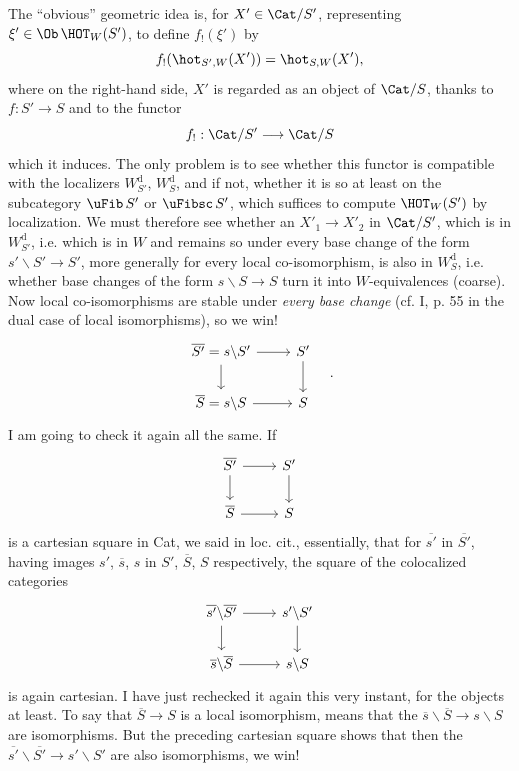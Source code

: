 The ``obvious'' geometric idea is, for $X'\in\Cat/S'$, representing $\xi'\in\Ob\,\HOT_W(S')$, to define $f_!(\xi')$ by
\[ f_!(\hot_{S',W}(X')) = \hot_{S,W}(X'), \]
where on the right-hand side, $X'$ is regarded as an object of $\Cat/S$, thanks to $f:S'\longrightarrow S$ and to the functor
\[ f_! : \Cat/S' \longrightarrow \Cat/S \]
which it induces. The only problem is to see whether this functor is compatible with the
localizers $W_{S'}^{\mathrm{d}}$, $W_S^{\mathrm{d}}$, and if not, whether it is so at least on the subcategory $\uFib\,S'$ or $\uFibsc\,S'$, which suffices to compute $\HOT_W(S')$ by localization. We must therefore see whether an $X'_1\longrightarrow X'_2$ in $\Cat/S'$, which is in $W_{S'}^{\mathrm{d}}$, i.e. which is in $W$ and remains so under every base change of the form $s'\backslash S'\longrightarrow S'$, more generally for every local co-isomorphism, is also in $W_S^{\mathrm{d}}$, i.e. whether base changes of the form $s\backslash S\longrightarrow S$ turn it into $W$-equivalences (coarse). Now local co-isomorphisms are stable under \textit{every base change} (cf. I, p. 55 in the dual case of local isomorphisms), so we win!
\[
\begin{tikzcd}
\overline{S'} = s\backslash S' \arrow[r] \arrow[d] & S' \arrow[d] \\
\overline{S} = s\backslash S \arrow[r] & S
\end{tikzcd}
\quad .
\]
I am going to check it again all the same. If
\[
\begin{tikzcd}
\overline{S'} \arrow[r] \arrow[d] & S' \arrow[d] \\
\overline{S} \arrow[r] & S
\end{tikzcd}
\]
is a cartesian square in Cat, we said in loc. cit., essentially, that for $\overline{s'}$ in $\overline{S'}$, having images $s'$, $\overline{s}$, $s$ in $S'$, $\overline{S}$, $S$ respectively, the square of the colocalized categories
\[
\begin{tikzcd}
\overline{s'}\backslash\overline{S'} \arrow[r] \arrow[d] & s'\backslash S' \arrow[d] \\
\overline{s}\backslash\overline{S} \arrow[r] & s\backslash S
\end{tikzcd}
\]
is again
cartesian. I have just rechecked it again this very instant, for the objects at least. To say that $\overline{S}\longrightarrow S$ is a local isomorphism, means that the $\overline{s}\backslash\overline{S}\longrightarrow s\backslash S$ are isomorphisms. But the preceding cartesian square shows that then the $\overline{s'}\backslash\overline{S'}\longrightarrow s'\backslash S'$ are also isomorphisms, we win! %

